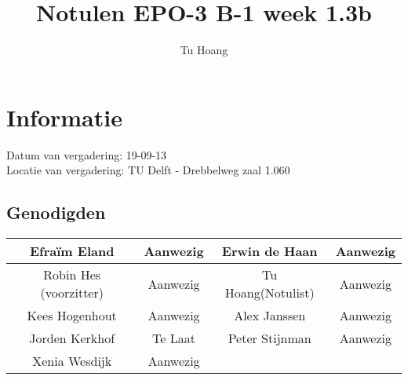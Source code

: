 \documentclass{article}
\begin{document}
\title{Notulen EPO-3 B-1 week 1.3b }%
\author{Tu Hoang}%
\maketitle

\section*{Informatie}
Datum van vergadering: 19-09-13\\ %
Locatie van vergadering: TU Delft - Drebbelweg zaal 1.060 %
\subsection*{Genodigden}
\begin{center}
\begin{tabular}{|c |c | c| c|}
	\hline
Efraïm Eland & Aanwezig & Erwin de Haan & Aanwezig \\
	\hline
Robin Hes (voorzitter) & Aanwezig & Tu Hoang(Notulist) & Aanwezig \\
	\hline
Kees Hogenhout & Aanwezig & Alex Janssen & Aanwezig\\
	\hline
Jorden Kerkhof & Te Laat & Peter Stijnman & Aanwezig \\
	\hline
Xenia Wesdijk & Aanwezig & & \\
	\hline
\end{tabular}
\end{center}
\end{document}
